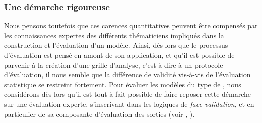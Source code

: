 \subsubsection{Une démarche rigoureuse} Nous pensons toutefois que ces carences quantitatives peuvent être compensés par les connaissances expertes des différents thématiciens impliqués dans la construction et l'évaluation d'un modèle.
Ainsi, dès lors que le processus d'évaluation est pensé en amont de son application, et qu'il est possible de parvenir à la création d'une grille d'analyse, c'est-à-dire à un protocole d'évaluation, il nous semble que la différence de \og validité\fg{} vis-à-vis de l'évaluation statistique se restreint fortement.
Pour évaluer les modèles du type de \simfeodal{}, nous considérons dès lors qu'il est tout à fait possible de faire reposer cette démarche sur une évaluation experte, s'inscrivant dans les logiques de \textit{face validation}, et en particulier de sa composante d'évaluation des sorties (voir , ).

